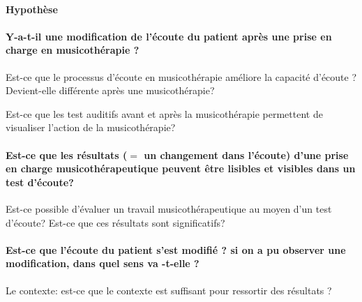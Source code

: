    
   
   
   







\paragraph{Hypothèse}



\paragraph{Y-a-t-il une modification de l'écoute du patient après une prise
en charge en musicothérapie ?}
Est-ce que le processus d'écoute en musicothérapie améliore la capacité
d'écoute ? Devient-elle différente après une musicothérapie?

Est-ce que les test auditifs avant et après la musicothérapie permettent
de visualiser l'action de la musicothérapie?


\paragraph{Est-ce que les résultats ($=$ un changement dans l'écoute) d'une prise
en charge musicothérapeutique peuvent être lisibles et visibles dans
un test d'écoute?}
Est-ce possible d'évaluer un travail musicothérapeutique au moyen
d'un test d'écoute?
Est-ce que ces résultats sont significatifs? 

\paragraph{Est-ce que l'écoute du patient s'est modifié ? si on a pu observer
une modification, dans quel sens va -t-elle ?}

Le contexte: 
est-ce que le contexte est suffisant pour
ressortir des résultats ?





